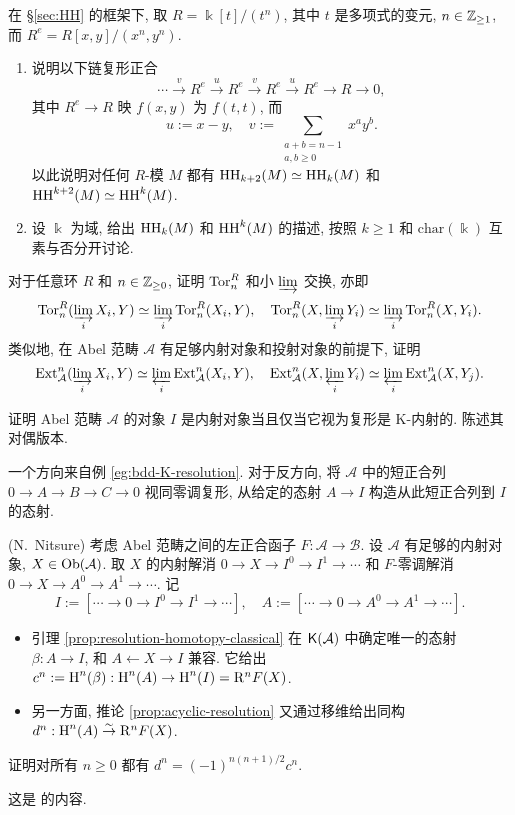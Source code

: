 \begin{Exercises}
	\item 在 \S\ref{sec:HH} 的框架下, 取 $R = \Bbbk[t]/(t^n)$, 其中 $t$ 是多项式的变元, $n \in \mathbb{Z}_{\geq 1}$, 而 $R^e = R[x,y]/(x^n, y^n)$.
	\begin{enumerate}
		\item 说明以下链复形正合
		\[ \cdots \xrightarrow{v} R^e \xrightarrow{u} R^e \xrightarrow{v} R^e \xrightarrow{u} R^e \to R \to 0 , \]
		其中 $R^e \to R$ 映 $f(x,y)$ 为 $f(t,t)$, 而
		\[ u := x-y, \quad v := \sum_{\substack{a+b=n-1 \\ a, b \geq 0}} x^a y^b . \]
		以此说明对任何 $R$-模 $M$ 都有 $\operatorname{HH}_{k+2}(M) \simeq \operatorname{HH}_k(M)$ 和 $\operatorname{HH}^{k+2}(M) \simeq \operatorname{HH}^k(M)$.

		\item 设 $\Bbbk$ 为域, 给出 $\operatorname{HH}_k(M)$ 和 $\operatorname{HH}^k(M)$ 的描述, 按照 $k \geq 1$ 和 $\mathrm{char}(\Bbbk)$ 互素与否分开讨论.
	\end{enumerate}

	\item 对于任意环 $R$ 和 $n \in \mathbb{Z}_{\geq 0}$, 证明 $\operatorname{Tor}^R_n$ 和小 $\varinjlim$ 交换, 亦即
	\[ \operatorname{Tor}^R_n(\varinjlim_i X_i, Y) \simeq \varinjlim_i \operatorname{Tor}^R_n(X_i, Y), \quad \operatorname{Tor}^R_n(X, \varinjlim_i Y_i) \simeq \varinjlim_i \operatorname{Tor}^R_n(X, Y_i). \]
	类似地, 在 Abel 范畴 $\mathcal{A}$ 有足够内射对象和投射对象的前提下, 证明
	\[ \operatorname{Ext}_{\mathcal{A}}^n(\varinjlim_i X_i, Y) \simeq \varprojlim_i \operatorname{Ext}_{\mathcal{A}}^n(X_i, Y), \quad \operatorname{Ext}_{\mathcal{A}}^n(X, \varprojlim_i Y_i) \simeq \varprojlim_i \operatorname{Ext}_{\mathcal{A}}^n(X, Y_j) . \]

	\item 证明 Abel 范畴 $\mathcal{A}$ 的对象 $I$ 是内射对象当且仅当它视为复形是 K-内射的. 陈述其对偶版本.
	\begin{hint}
		一个方向来自例 \ref{eg:bdd-K-resolution}. 对于反方向, 将 $\mathcal{A}$ 中的短正合列 $0 \to A \to B \to C \to 0$ 视同零调复形, 从给定的态射 $A \to I$ 构造从此短正合列到 $I$ 的态射.
	\end{hint}

	\item (N.\ Nitsure) 考虑 Abel 范畴之间的左正合函子 $F: \mathcal{A} \to \mathcal{B}$. 设 $\mathcal{A}$ 有足够的内射对象, $X \in \operatorname{Ob}(\mathcal{A})$. 取 $X$ 的内射解消 $0 \to X \to I^0 \to I^1 \to \cdots$ 和 $F$-零调解消 $0 \to X \to A^0 \to A^1 \to \cdots$. 记
	\[ I := [\cdots \to 0 \to I^0 \to I^1 \to \cdots], \quad A := [\cdots \to 0 \to A^0 \to A^1 \to \cdots ]. \]
	\begin{itemize}
		\item 引理 \ref{prop:resolution-homotopy-classical} 在 $\mathsf{K}(\mathcal{A})$ 中确定唯一的态射 $\beta: A \to I$, 和 $A \leftarrow X \rightarrow I$ 兼容. 它给出 $c^n := \operatorname{H}^n(\beta): \operatorname{H}^n(A) \to \operatorname{H}^n(I) = \mathrm{R}^n F(X)$.
		\item 另一方面, 推论 \ref{prop:acyclic-resolution} 又通过移维给出同构 $d^n: \operatorname{H}^n(A) \stackrel{\sim}{\rightarrow} \mathrm{R}^n F(X)$.
	\end{itemize}
	证明对所有 $n \geq 0$ 都有 $d^n = (-1)^{n(n+1)/2} c^n$.
	\begin{hint}
		这是 \cite{Ni09} 的内容.
	\end{hint}
\end{Exercises}
